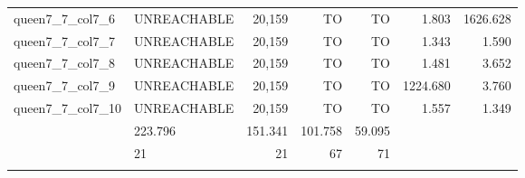 \begin{tabular}{llr|rrrr}
  queen7\_7\_col7\_6 & UNREACHABLE & 20,159 & TO & TO & 1.803 & 1626.628 \\
  queen7\_7\_col7\_7 & UNREACHABLE & 20,159 & TO & TO & 1.343 & 1.590 \\
  queen7\_7\_col7\_8 & UNREACHABLE & 20,159 & TO & TO & 1.481 & 3.652 \\
  queen7\_7\_col7\_9 & UNREACHABLE & 20,159 & TO & TO & 1224.680 & 3.760 \\ %
  queen7\_7\_col7\_10 & UNREACHABLE & 20,159 & TO & TO & 1.557 & 1.349 \\ \bhline
  \multicolumn{3}{r|}{平均CPU時間} & 223.796 & 151.341 & 101.758 & 59.095 \\ \bhline
  \multicolumn{3}{r|}{解けた問題数} & 21 & 21 & 67 & 71 \\ \bhline
\end{tabular}


